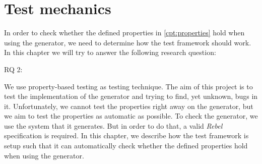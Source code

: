 \chapter{Test mechanics}
\label{cpt:testmechanics}
In order to check whether the defined properties in \autoref{cpt:properties}
hold when using the generator, we need to determine how the test framework
should work. In this chapter we will try to answer the following research
question:
\begin{description}
  \item [RQ 2:] \rqTwo
\end{description}

We use property-based testing as testing technique. The aim of this project is
to test the implementation of the generator and trying to find, yet unknown,
bugs in it. Unfortunately, we cannot test the properties right away on the
generator, but we aim to test the properties as automatic as possible. To check
the generator, we use the system that it generates. But in order to do that, a
valid \textit{Rebel} specification is required. In this chapter, we describe how
the test framework is setup such that it can automatically check whether the
defined properties hold when using the generator.

